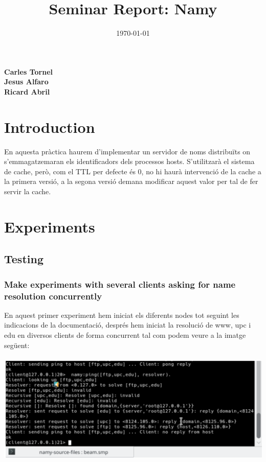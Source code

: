 \documentclass[a4paper, 10pt]{article}
\title{Seminar Report: Namy}
\date{\normalsize\today{}}
\begin{document}
\author{}
\maketitle

\begin{center}
  \textbf{Carles Tornel}\\
  \textbf{Jesus Alfaro}\\
  \textbf{Ricard Abril}

\end{center}
\section{Introduction}
En aquesta pràctica haurem d'implementar un
servidor de noms distribuïts on s'emmagatzemaran
els identificadors dels processos hosts. S'utilitzarà el sistema de cache, però, com el TTL per defecte és 0, no hi haurà intervenció de la cache a la primera versió, a la segona versió demana modificar aquest valor per tal de fer servir la cache.

\newpage\section{Experiments}

\subsection{Testing}
\subsubsection{Make experiments with several clients asking for name resolution concurrently}
En aquest primer experiment hem iniciat els diferents nodes tot seguint les indicacions de la documentació, després hem iniciat la resolució de www, upc i edu en diversos clients de forma concurrent tal com podem veure a la imatge següent:\\\\
\includegraphics[width=\textwidth]{Ex1.png}\\\\
\end{document}
